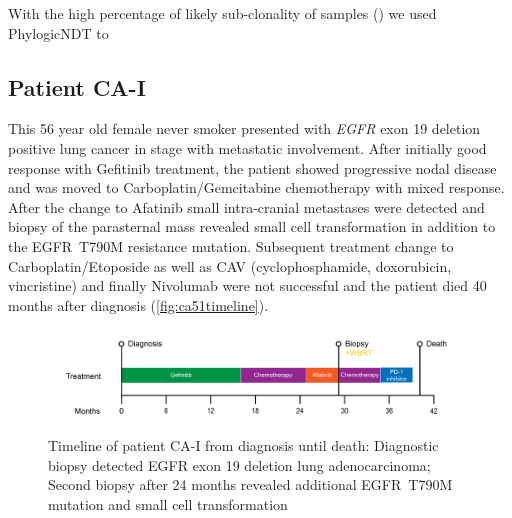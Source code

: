 With the high percentage of likely sub-clonality of samples () we used PhylogicNDT to


\cleardoublepage




\subsection{Patient CA-I}
\label{cascade-sec:CA51}

This 56 year old female never smoker presented with \textit{EGFR} exon 19 deletion positive lung cancer in stage  with metastatic involvement. After initially good response with Gefitinib treatment, the patient showed progressive nodal disease and was moved to Carboplatin/Gemcitabine chemotherapy with mixed response. After the change to Afatinib small intra-cranial metastases were detected and biopsy of the parasternal mass revealed small cell transformation in addition to the EGFR~T790M resistance mutation. Subsequent treatment change to Carboplatin/Etoposide as well as CAV (cyclophosphamide, doxorubicin, vincristine) and finally Nivolumab were not successful and the patient died 40 months after diagnosis (\autoref{fig:ca51timeline}).

\begin{figure}[ht]
	\centering
	\includegraphics[width=.99\linewidth]{Figures/CASCADE/CA51/CA-I_timeline}
	\caption[Timeline of patient CA-I from diagnosis until death]{Timeline of patient CA-I from diagnosis until death: Diagnostic biopsy detected EGFR exon 19 deletion lung adenocarcinoma; Second biopsy after 24 months revealed additional EGFR~T790M mutation and small cell transformation} \label{fig:ca51timeline}
\end{figure}

